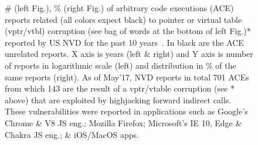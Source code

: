 \begin{figure}[t!]
\centering
{}
\vspace{-.7cm}
\caption{\# (left Fig.), \% (right Fig.) of arbitrary code executions (ACE) reports related (all colors expect black) to pointer or virtual table (vptr/vtbl) corruption 
(see bag of words at the bottom of left Fig.)* reported by US NVD for the past 10 years~\cite{NVD:ACE}. In black are the ACE unrelated reports.
X axis is years (left \& right) and Y axis is number of reports in logarithmic scale (left) and distribution in \% of the same reports (right).
As of May'17, NVD reports in total 701 ACEs from which 143 are the result of a vptr/vtable corruption (see * above) that are exploited by highjacking forward indirect calls.
These vulnerabilities were reported in applications such as Google's Chrome \& V8 JS eng.; Mozilla Firefox; Microsoft's IE 10, Edge \& Chakra JS eng.;
\& iOS/MacOS apps.}
\label{ace:nvd:statistics}
\vspace{-.5cm}
\end{figure}


